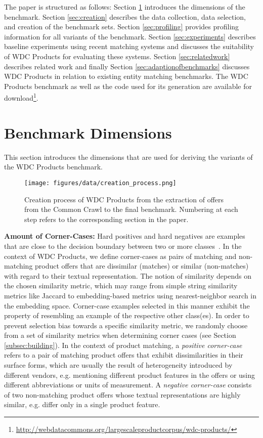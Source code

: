 \documentclass[sigconf,edbt]{acmart-edbt2024}
\begin{document}
The paper is structured as follows: Section \ref{sec:terminology} introduces the dimensions of the benchmark. Section \ref{sec:creation} describes the data collection, data selection, and creation of the benchmark sets. Section \ref{sec:profiling} provides profiling information for all variants of the benchmark. Section \ref{sec:experiments} describes baseline experiments using recent matching systems and discusses the suitability of WDC Products for evaluating these systems. Section \ref{sec:relatedwork} describes related work and finally Section \ref{sec:adaptionofbenchmarks} discusses WDC Products in relation to existing entity matching benchmarks.
The WDC Products benchmark as well as the code used for its generation are available for download\footnote{\url{http://webdatacommons.org/largescaleproductcorpus/wdc-products/}}.

 \section{Benchmark Dimensions}
\label{sec:terminology}

This section introduces the dimensions that are used for deriving the variants of the WDC Products benchmark. \begin{figure*}
  \centering
  \texttt{[image: figures/data/creation\_process.png]}
  \caption {Creation process of WDC Products from the extraction of offers from the Common Crawl to the final benchmark. Numbering at each step refers to the corresponding section in the paper.}
  \label{fig:process}
\end{figure*} 

\textbf{Amount of Corner-Cases:} Hard positives and hard negatives are examples that are close to the decision boundary between two or more classes~\cite{simo-serraDiscriminativeLearningDeep2015,schroffFaceNetUnifiedEmbedding2015a,zhanOptimizingDenseRetrieval2021}.
 In the context of WDC Products, we define corner-cases as pairs of matching and non-matching product offers that are dissimilar (matches) or similar (non-matches) with regard to their textual representation. The notion of similarity depends on the chosen similarity metric, which may range from simple string similarity metrics like Jaccard to embedding-based metrics using nearest-neighbor search in the embedding space. Corner-case examples selected in this manner exhibit the property of resembling an example of the respective other class(es). In order to prevent selection bias towards a specific similarity metric, we randomly choose from a set of similarity metrics when determining corner cases (see Section \ref{subsec:building}). 
In the context of product matching, a \textit{positive corner-case} refers to a pair of matching product offers that exhibit dissimilarities in their surface forms, which are usually the result of heterogeneity introduced by different vendors, e.g. mentioning different product features in the offers or using different abbreviations or units of measurement. A \textit{negative corner-case} consists of two non-matching product offers whose textual representations are highly similar, e.g. differ only in a single product feature. 
\end{document}
